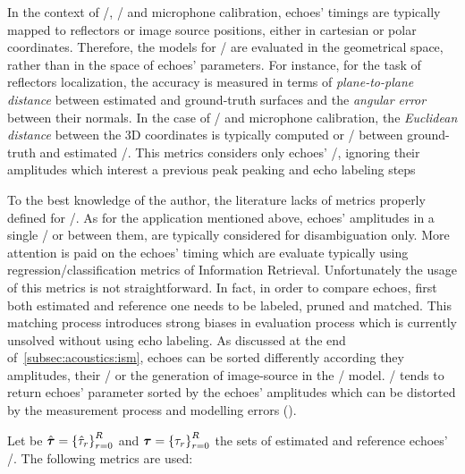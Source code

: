 \mynewline
In the context of \RooGE/, \SSL/ and microphone calibration, echoes' timings are typically mapped to reflectors or image source positions, either in cartesian or polar coordinates.
Therefore, the models for \AER/ are evaluated in the geometrical space, rather than in the space of echoes' parameters.
For instance, for the task of reflectors localization, the accuracy is measured in terms of \textit{plane-to-plane distance} between estimated and ground-truth surfaces and the \textit{angular error} between their normals.
In the case of \SSL/ and microphone calibration, the \textit{Euclidean distance} between the 3D coordinates is typically computed or \RMSE/ between ground-truth and estimated \DOAs/.
This metrics considers only echoes' \TOA/, ignoring their amplitudes which interest a previous peak peaking and echo labeling steps

\mynewline
To the best knowledge of the author, the literature lacks of metrics properly defined for \AER/.
As for the application mentioned above, echoes' amplitudes in a single \RIR/ or between them, are typically considered for disambiguation only.
More attention is paid on the echoes' timing which are evaluate typically using regression/classification metrics of Information Retrieval.
Unfortunately the usage of this metrics is not straightforward.
In fact, in order to compare echoes, first both estimated and reference one needs to be labeled, pruned and matched.
This matching process introduces strong biases in evaluation process which is currently unsolved without using echo labeling.
As discussed at the end of~\cref{subsec:acoustics:ism}, echoes can be sorted differently according they amplitudes, their \TOAs/ or the generation of image-source in the \ISM/ model.
\AER/ tends to return echoes' parameter sorted by the echoes' amplitudes which can be distorted by the measurement process and modelling errors ().

Let be $\hat{\boldsymbol{\tau}} = \kbrace{\hat{\tau}_\idxEch}_{\idxEch=0}^{\numEchs}$ and $\boldsymbol{\tau} = \kbrace{\tau_\idxEch}_{\idxEch=0}^{\numEchs}$ the sets of estimated and reference echoes' \TOAs/.
The following metrics are used:


